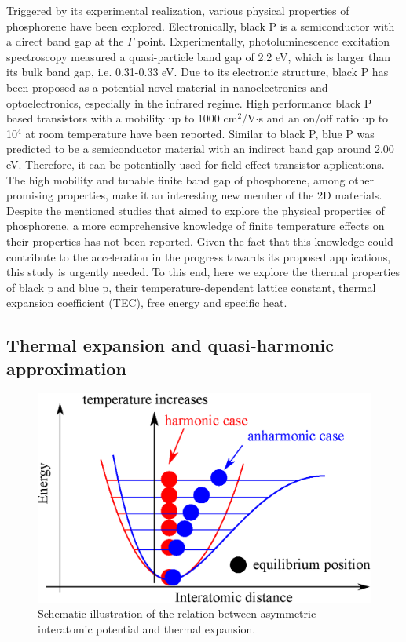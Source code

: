 Triggered by its experimental realization, various physical properties of phosphorene have been explored. Electronically, black P is a semiconductor with a direct band gap at the $\Gamma$ point\cite{Zhu2014,deniz3}. Experimentally, photoluminescence excitation spectroscopy measured a quasi-particle band gap of 2.2 eV\cite{bp-ex-3}, which is larger than its bulk band gap, i.e. 0.31-0.33 eV\cite{Maruyama198199,Narita1983422}. Due to its electronic structure, black P has been proposed as a potential novel material in nanoelectronics and optoelectronics, especially in the infrared regime. High performance black P based transistors with a mobility up to 1000 cm$^2$/V$\cdot$s and an on/off ratio up to 10$^4$ at room temperature have been reported\cite{Li2014,Han2014}. Similar to black P, blue P was predicted to be a semiconductor material with an indirect band gap around 2.00 eV\cite{Zhu2014}. Therefore, it can be potentially used for field-effect transistor applications. The high mobility and tunable finite band gap of phosphorene, among other promising properties\cite{Jain2015,Wei2014,Kou2014,Tahir2015,zhou2014}, make it an interesting new member of the 2D materials. Despite the mentioned studies that aimed to explore the physical properties of phosphorene, a more comprehensive knowledge of finite temperature effects on their properties has not been reported. Given the fact that this knowledge could contribute to the acceleration in the progress towards its proposed applications, this study\cite{Aierken2015.thermalP} is urgently needed. To this end, here we explore the thermal properties of black p and blue p, their temperature-dependent lattice constant, thermal expansion coefficient (TEC), free energy and specific heat.

\subsection{Thermal expansion and quasi-harmonic approximation}

\begin{figure}[htbp!] 
\centering
\includegraphics[width=0.8\linewidth]{anh_exp.eps}%
\caption{Schematic illustration of the relation between asymmetric interatomic potential and thermal expansion. }
\label{fig:anh_exp}
\end{figure}

